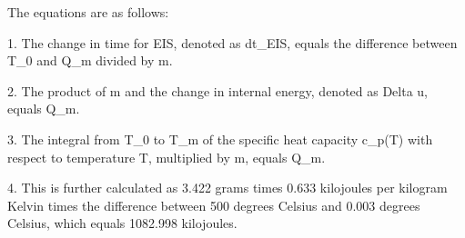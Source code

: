 The equations are as follows:

1. The change in time for EIS, denoted as dt_EIS, equals the difference between T_0 and Q_m divided by m.

2. The product of m and the change in internal energy, denoted as Delta u, equals Q_m.

3. The integral from T_0 to T_m of the specific heat capacity c_p(T) with respect to temperature T, multiplied by m, equals Q_m.

4. This is further calculated as 3.422 grams times 0.633 kilojoules per kilogram Kelvin times the difference between 500 degrees Celsius and 0.003 degrees Celsius, which equals 1082.998 kilojoules.
